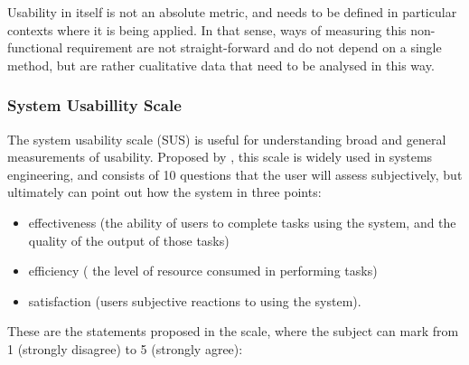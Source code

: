 Usability in itself is not an absolute metric, and needs to be defined in particular contexts where it is being applied. In that sense, ways of measuring this non-functional requirement are not straight-forward and do not depend on a single method, but are rather cualitative data that need to be analysed in this way.

\subsubsection{System Usabillity Scale}

The system usability scale (SUS) is useful for understanding broad and general measurements of usability. Proposed by \cite{art:sus-1996}, this scale is widely used in systems engineering, and consists of 10 questions that the user will assess subjectively, but ultimately can point out how the system in three points:

\begin{itemize}
    \item effectiveness (the ability of users to complete tasks using the system, and the quality of the output of those tasks)
    \item efficiency ( the level of resource consumed in performing tasks)
    \item satisfaction (users subjective reactions to using the system). \citep{art:sus-1996}
\end{itemize}

These are the statements proposed in the scale, where the subject can mark from 1 (strongly disagree) to 5 (strongly agree):

